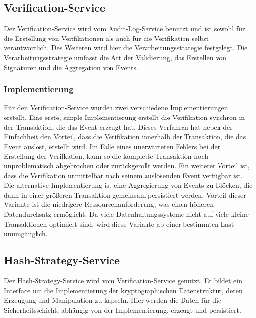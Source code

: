 \subsection{Verification-Service}
Der Verification-Service wird vom Audit-Log-Service benutzt und ist sowohl für die Erstellung von Verifikationen als auch für die Verifikation selbst verantwortlich. Des Weiteren wird hier die Verarbeitungsstrategie festgelegt. Die Verarbeitungsstrategie umfasst die Art der Validierung, das Erstellen von Signaturen und die Aggregation von Events. 

\subsubsection{Implementierung}
Für den Verification-Service wurden zwei verschiedene Implementierungen erstellt. Eine erste, simple Implementierung erstellt die Verifikation synchron in der Transaktion, die das Event erzeugt hat. Dieses Verfahren hat neben der Einfachheit den Vorteil, dass die Verifikation innerhalb der Transaktion, die das Event auslöst, erstellt wird. Im Falle eines unerwarteten Fehlers bei der Erstellung der Verifkation, kann so die komplette Transaktion noch unproblematisch abgebrochen oder zurückgerollt werden. Ein weiterer Vorteil ist, dass die Verifikation unmittelbar nach seinem auslösenden Event verfügbar ist.\\
Die alternative Implementierung ist eine Aggregierung von Events zu Blöcken, die dann in einer größeren Transaktion gemeinsam persistiert werden. Vorteil dieser Variante ist die niedrigere Ressourcenanforderung, was einen höheren Datendurchsatz ermöglicht. Da viele Datenhaltungssysteme nicht auf viele kleine Transaktionen optimiert sind, wird diese Variante ab einer bestimmten Last unumgänglich.

\subsection{Hash-Strategy-Service}
Der Hash-Strategy-Service wird vom Verification-Service genutzt. Er bildet ein Interface um die Implementierung der kryptographischen Datenstruktur, deren Erzeugung und Manipulation zu kapseln. Hier werden die Daten für die Sicherheitsschicht, abhängig von der Implementierung, erzeugt und persistiert.

